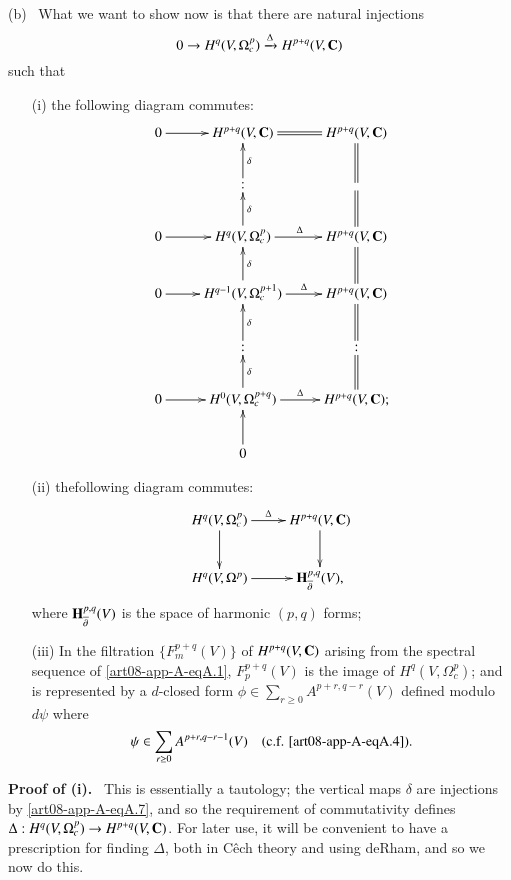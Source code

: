 (b)~ What we want to show now is that there are natural injections
\begin{equation}
0\to H^{q}(V,\Omega^{p}_{c})\xrightarrow{\Delta}H^{p+q}(V,\mathbf{C})\label{art08-app-A-eqA.15} 
\end{equation}
such that
\begin{itemize}
\item[(i)] the following diagram commutes:
\begin{equation}
\vcenter{\xymatrix{
0\ar[r] & H^{p+q}(V,\bfC)\ar@{=}[r] & H^{p+q}(V,\bfC)\\
 & :\ar[u]_-{\delta} & \ar@{=}[u]\\
0\ar[r] & H^{q}(V,\Omega^{p}_{c})\ar[u]_-{\delta} \ar[r]^{\Delta} & H^{p+q}(V,\bfC)\ar@{=}[u]\\
0\ar[r] & H^{q-1}(V,\Omega^{p+1}_{c})\ar[u]_-{\delta}\ar[r]^-{\Delta} & H^{p+q}(V,\bfC)\ar@{=}[u]\\
 & :\ar[u]_-{\delta} & :\ar@{=}[u]\\
0\ar[r] & H^{0}(V,\Omega^{p+q}_{c})\ar[u]_-{\delta}\ar[r]^-{\Delta} & H^{p+q}(V,\bfC);\ar@{=}[u]\\
 & 0\ar[u] & 
}}\label{art08-app-A-eqA.16} 
\end{equation}

\item[(ii)] the\pageoriginale following diagram commutes:
\begin{equation}
\vcenter{\xymatrix{
H^{q}(V,\Omega^{p}_{c})\ar[d]\ar[r]^-{\Delta} & H^{p+q}(V,\bfC)\ar[d]\\
H^{q}(V,\Omega^{p})\ar[r] & \bfH^{p,q}_{\overline{\partial}}(V),
}}\label{art08-app-A-eqA.17} 
\end{equation}
where $\mathbf{H}^{p,q}_{\overline{\partial}}(V)$ is the space of harmonic $(p,q)$ forms;

\item[(iii)] In the filtration $\{F^{p+q}_{m}(V)\}$ of $H^{p+q}(V,\mathbf{C})$ arising from the spectral sequence of \eqref{art08-app-A-eqA.1}, $F^{p+q}_{p}(V)$ is the image of $H^{q}(V,\Omega^{p}_{c})$; and is represented by a $d$-closed form $\phi\in \sum\limits_{r\geq 0}A^{p+r,q-r}(V)$ defined modulo $d\psi$ where 
\begin{equation}
\psi\in \sum\limits_{r\geq 0}A^{p+r,q-r-1}(V)\quad\text{(c.f. \eqref{art08-app-A-eqA.4}).}\label{art08-app-A-eqA.18}
\end{equation}
\end{itemize}

\noindent
{\bf Proof of (i).}~ This is essentially a tautology; the vertical maps $\delta$ are injections by \eqref{art08-app-A-eqA.7}, and so the requirement of commutativity defines $\Delta : H^{q}(V,\Omega^{p}_{c})\to H^{p+q}(V,\mathbf{C})$. For later use, it will be convenient to have a prescription for finding $\Delta$, both in C\^ech theory and using deRham, and so we now do this.


